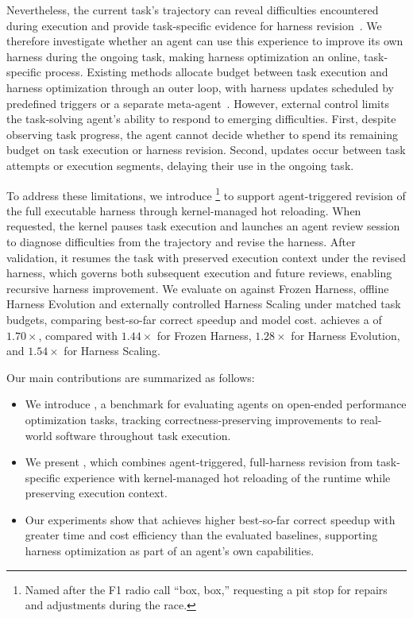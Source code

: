 Nevertheless, the current task's trajectory can reveal difficulties encountered during execution and provide task-specific evidence for harness revision~\citep{nie2026tthe}. We therefore investigate whether an agent can use this experience to improve its own harness during the ongoing task, making harness optimization an online, task-specific process.
%
Existing methods allocate budget between task execution and harness optimization through an outer loop, with harness updates scheduled by predefined triggers or a separate meta-agent~\citep{wang2026harnessevolution,liu2026evox,zhang2026agenticevolution}. However, external control limits the task-solving agent's ability to respond to emerging difficulties. First, despite observing task progress, the agent cannot decide whether to spend its remaining budget on task execution or harness revision. Second, updates occur between task attempts or execution segments, delaying their use in the ongoing task.

To address these limitations, we introduce \boxbox{}\footnote{Named after the F1 radio call ``box, box,'' requesting a pit stop for repairs and adjustments during the race.} to support agent-triggered revision of the full executable harness through kernel-managed hot reloading.
When requested, the kernel pauses task execution and launches an agent review session to diagnose difficulties from the trajectory and revise the harness.
After validation, it resumes the task with preserved execution context under the revised harness, which governs both subsequent execution and future reviews, enabling recursive harness improvement.
We evaluate \boxbox{} on \perfrace{} against Frozen Harness, offline Harness Evolution and externally controlled Harness Scaling under matched task budgets, comparing best-so-far correct speedup and model cost. \boxbox{} achieves a  of \(1.70\times\), compared with \(1.44\times\) for Frozen Harness, \(1.28\times\) for Harness Evolution, and \(1.54\times\) for Harness Scaling.

Our main contributions are summarized as follows:
\begin{itemize}
    \item We introduce \perfrace{}, a benchmark for evaluating agents on open-ended performance optimization tasks, tracking correctness-preserving improvements to real-world software throughout task execution.
    \item We present \boxbox{}, which combines agent-triggered, full-harness revision from task-specific experience with kernel-managed hot reloading of the runtime while preserving execution context.
    \item Our experiments show that \boxbox{} achieves higher best-so-far correct speedup with greater time and cost efficiency than the evaluated baselines, supporting harness optimization as part of an agent's own capabilities.
\end{itemize}
